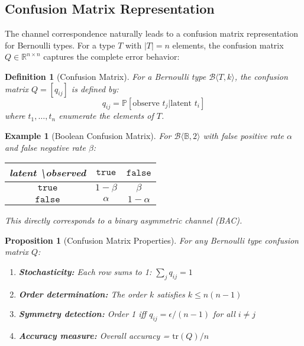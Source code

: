 \documentclass[11pt,final,hidelinks]{article}
\newtheorem{proposition}[theorem]{Proposition}
\newtheorem{definition}[theorem]{Definition}
\newtheorem{example}[theorem]{Example}
\newcommand{\bernoulli}[2]{\mathcal{B}\langle #1, #2 \rangle}
\newcommand{\Bool}{\mathbb{B}}
\newcommand{\Prob}[1]{\mathbb{P}\left[#1\right]}
\begin{document}
\subsection{Confusion Matrix Representation}

The channel correspondence naturally leads to a confusion matrix representation for Bernoulli types. For a type $T$ with $|T| = n$ elements, the confusion matrix $Q \in \mathbb{R}^{n \times n}$ captures the complete error behavior:

\begin{definition}[Confusion Matrix]
For a Bernoulli type $\bernoulli{T}{k}$, the confusion matrix $Q = [q_{ij}]$ is defined by:
\begin{equation}
q_{ij} = \Prob{\text{observe } t_j | \text{latent } t_i}
\end{equation}
where $t_1, \ldots, t_n$ enumerate the elements of $T$.
\end{definition}

\begin{example}[Boolean Confusion Matrix]
For $\bernoulli{\Bool}{2}$ with false positive rate $\alpha$ and false negative rate $\beta$:

\begin{center}
\begin{tabular}{c|cc}
latent \textbackslash observed & $\mathtt{true}$ & $\mathtt{false}$ \\
\hline
$\mathtt{true}$ & $1-\beta$ & $\beta$ \\
$\mathtt{false}$ & $\alpha$ & $1-\alpha$
\end{tabular}
\end{center}

This directly corresponds to a binary asymmetric channel (BAC).
\end{example}

\begin{proposition}[Confusion Matrix Properties]
For any Bernoulli type confusion matrix $Q$:
\begin{enumerate}
    \item \textbf{Stochasticity:} Each row sums to 1: $\sum_j q_{ij} = 1$
    \item \textbf{Order determination:} The order $k$ satisfies $k \leq n(n-1)$
    \item \textbf{Symmetry detection:} Order 1 iff $q_{ij} = \epsilon/(n-1)$ for all $i \neq j$
    \item \textbf{Accuracy measure:} Overall accuracy = $\text{tr}(Q)/n$
\end{enumerate}
\end{proposition}
\end{document}
